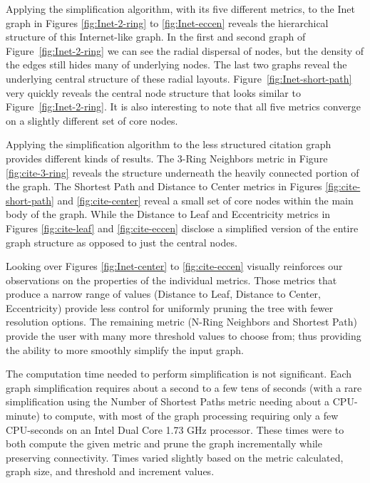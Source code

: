 Applying the simplification algorithm, with its five different metrics, to the Inet graph in Figures \ref{fig:Inet-2-ring} to \ref{fig:Inet-eccen} reveals the hierarchical structure of this Internet-like graph.  In the first and second graph of Figure~\ref{fig:Inet-2-ring} we can see the radial dispersal of nodes, but the density of the edges still hides many of underlying nodes.  The last two graphs reveal the underlying central structure of these radial layouts.  Figure~\ref{fig:Inet-short-path} very quickly reveals the central node structure that looks similar to Figure~\ref{fig:Inet-2-ring}.  It is also interesting to note that all five metrics converge on a slightly different set of core nodes.

Applying the simplification algorithm to the less structured citation graph provides different kinds of results.  The 3-Ring Neighbors metric in Figure \ref{fig:cite-3-ring} reveals the structure underneath the heavily connected portion of the graph.  The Shortest Path and Distance to Center metrics in Figures \ref{fig:cite-short-path} and \ref{fig:cite-center} reveal a small set of core nodes within the main body of the graph.  While the Distance to Leaf and Eccentricity metrics in Figures \ref{fig:cite-leaf} and \ref{fig:cite-eccen} disclose a simplified version of the entire graph structure as opposed to just the central nodes.

Looking over Figures \ref{fig:Inet-center} to \ref{fig:cite-eccen} visually reinforces our observations on the properties of the individual metrics.  Those metrics that produce a narrow range of values (Distance to Leaf, Distance to Center, Eccentricity) provide less control for uniformly pruning the tree with fewer resolution options. The remaining metric (N-Ring Neighbors and Shortest Path) provide the user with many more threshold values to choose from; thus providing the ability to more smoothly simplify the input graph. 

The computation time needed to perform simplification is not significant. Each graph simplification requires about a second to a few tens of seconds (with a rare simplification using the Number of Shortest Paths metric needing about a CPU-minute) to compute, with most of the graph processing requiring only a few CPU-seconds on an Intel Dual Core 1.73 GHz processor. These times were to both compute the given metric and prune the graph incrementally while preserving connectivity.  Times varied slightly based on the metric calculated, graph size, and threshold and increment values.


